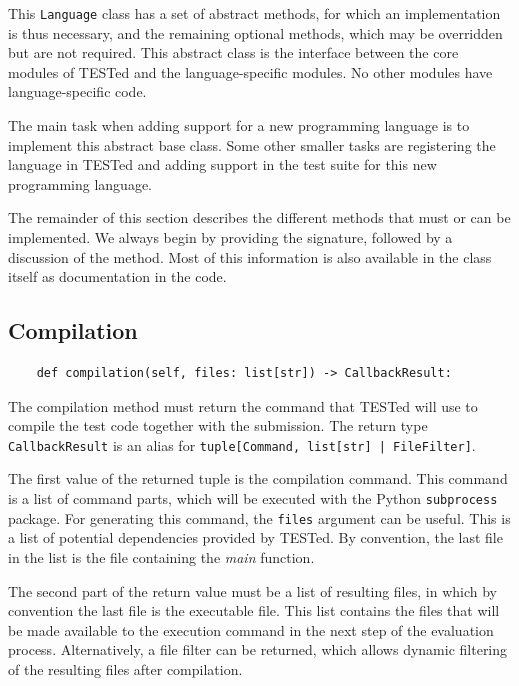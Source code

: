 \documentclass[../main]{subfiles}
\begin{document}
This \texttt{Language} class has a set of abstract methods, for which an implementation is thus necessary, and the remaining optional methods, which may be overridden but are not required.
This abstract class is the interface between the core modules of TESTed and the language-specific modules.
No other modules have language-specific code.

The main task when adding support for a new programming language is to implement this abstract base class.
Some other smaller tasks are registering the language in TESTed and adding support in the test suite for this new programming language.

The remainder of this section describes the different methods that must or can be implemented.
We always begin by providing the signature, followed by a discussion of the method.
Most of this information is also available in the class itself as documentation in the code.

\subsection{Compilation}\label{subsec:impl-compilation}

\begin{verbatim}
    def compilation(self, files: list[str]) -> CallbackResult:
\end{verbatim}

The compilation method must return the command that TESTed will use to compile the test code together with the submission.
The return type \texttt{CallbackResult} is an alias for \texttt{tuple[Command, list[str] | FileFilter]}.

The first value of the returned tuple is the compilation command.
This command is a list of command parts, which will be executed with the Python \texttt{subprocess} package.
For generating this command, the \texttt{files} argument can be useful.
This is a list of potential dependencies provided by TESTed.
By convention, the last file in the list is the file containing the \emph{main} function.

The second part of the return value must be a list of resulting files, in which by convention the last file is the executable file.
This list contains the files that will be made available to the execution command in the next step of the evaluation process.
Alternatively, a file filter can be returned, which allows dynamic filtering of the resulting files after compilation.
\end{document}
